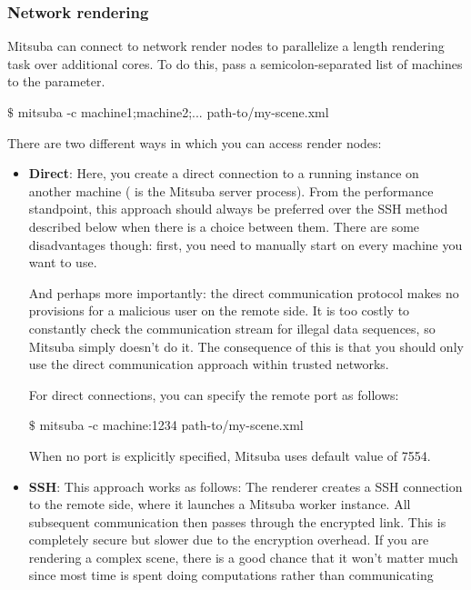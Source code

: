 \subsubsection{Network rendering}
Mitsuba can connect to network render nodes to parallelize a length rendering task
over additional cores. To do this, pass a semicolon-separated list of machines to
the  parameter.
\begin{shell}
$\texttt{\$}$ mitsuba -c machine1;machine2;... path-to/my-scene.xml
\end{shell}
There are two different ways in which you can access render nodes:
\begin{itemize}
\item\textbf{Direct}: Here, you create a direct connection to a running  instance on
another machine ( is the Mitsuba server process). From the performance
standpoint, this approach should always be preferred over the SSH method described below when there is
a choice between them. There are some disadvantages though: first, you need to manually start
 on every machine you want to use.

And perhaps more importantly: the direct communication
protocol makes no provisions for a malicious user on the remote side. It is too costly
to constantly check the communication stream for illegal data sequences, so Mitsuba simply doesn't do it.
The consequence of this is that you should only use the direct communication approach within
trusted networks.

For direct connections, you can specify the remote port as follows:
\begin{shell}
$\texttt{\$}$ mitsuba -c machine:1234 path-to/my-scene.xml
\end{shell}
When no port is explicitly specified, Mitsuba uses default value of 7554.
\item \textbf{SSH}:
    This approach works as follows: The renderer creates a SSH connection
    to the remote side, where it launches a Mitsuba worker instance.
    All subsequent communication then passes through the encrypted link.
    This is completely secure but slower due to the encryption overhead.
    If you are rendering a complex scene, there is a good chance that it
    won't matter much since most time is spent doing computations rather than
    communicating


\end{itemize}
